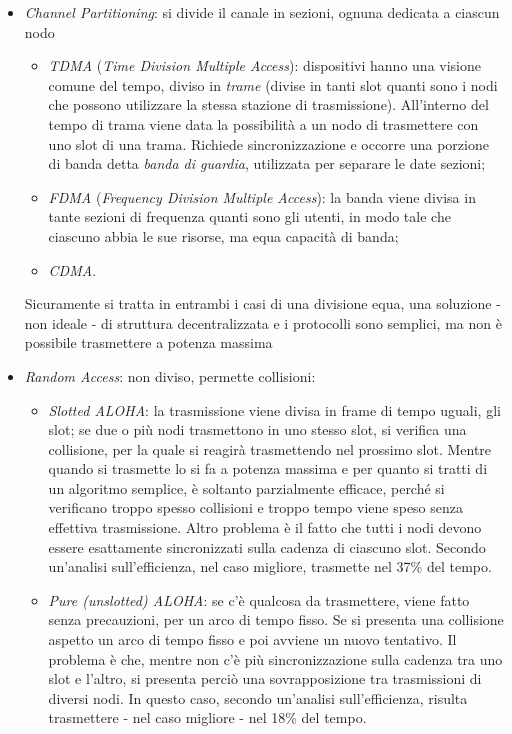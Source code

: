 \begin{itemize}
	\item \textit{Channel Partitioning}: si divide il canale in sezioni, ognuna dedicata a ciascun nodo
	\begin{itemize}
		\item \textit{TDMA} (\textit{Time Division Multiple Access}): dispositivi hanno una visione comune del tempo, diviso in \textit{trame} (divise in tanti slot quanti sono i nodi che possono utilizzare la stessa stazione di trasmissione). All'interno del tempo di trama viene data la possibilità a un nodo di trasmettere con uno slot di una trama. Richiede sincronizzazione e occorre una porzione di banda detta \textit{banda di guardia}, utilizzata per separare le date sezioni;
		\item \textit{FDMA} (\textit{Frequency Division Multiple Access}): la banda viene divisa in tante sezioni di frequenza quanti sono gli utenti, in modo tale che ciascuno abbia le sue risorse, ma equa capacità di banda;
		\item \textit{CDMA}.
	\end{itemize}
	Sicuramente si tratta in entrambi i casi di una divisione equa, una soluzione - non ideale - di struttura decentralizzata e i protocolli sono semplici, ma non è possibile trasmettere a potenza massima 
	\item \textit{Random Access}: non diviso, permette collisioni:
	\begin{itemize}
		\item \textit{Slotted ALOHA}: la trasmissione viene divisa in frame di tempo uguali, gli slot; se due o più nodi trasmettono in uno stesso slot, si verifica una collisione, per la quale si reagirà trasmettendo nel prossimo slot. Mentre quando si trasmette lo si fa a potenza massima e per quanto si tratti di un algoritmo semplice, è soltanto parzialmente efficace, perché si verificano troppo spesso collisioni e troppo tempo viene speso senza effettiva trasmissione. Altro problema è il fatto che tutti i nodi devono essere esattamente sincronizzati sulla cadenza di ciascuno slot. Secondo un'analisi sull'efficienza, nel caso migliore, trasmette nel 37\% del tempo.
		\item \textit{Pure (unslotted) ALOHA}: se c'è qualcosa da trasmettere, viene fatto senza precauzioni, per un arco di tempo fisso. Se si presenta una collisione aspetto un arco di tempo fisso e poi avviene un nuovo tentativo. Il problema è che, mentre non c'è più sincronizzazione sulla cadenza tra uno slot e l'altro, si presenta perciò una sovrapposizione tra trasmissioni di diversi nodi. In questo caso, secondo un'analisi sull'efficienza, risulta trasmettere - nel caso migliore - nel 18\% del tempo.

\end{itemize}
\end{itemize}
